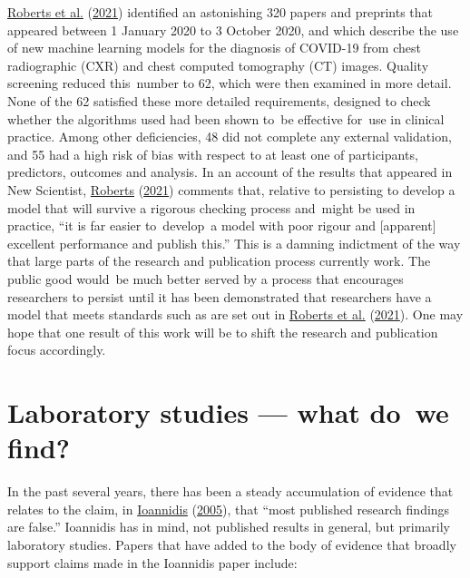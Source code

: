 \documentclass[
  10pt,
  b5paper]{book}
\begin{document}
\protect\hyperlink{ref-roberts2021common}{Roberts et al.} (\protect\hyperlink{ref-roberts2021common}{2021}) identified an astonishing 320 papers and preprints
that appeared between 1 January 2020 to 3 October 2020, and which
describe the use of new machine learning models for the diagnosis of
COVID-19 from chest radiographic (CXR) and chest computed tomography
(CT) images. Quality screening reduced this~number to 62, which were
then examined in more detail. None of the 62 satisfied these more
detailed requirements, designed to check whether the algorithms used
had been shown to~be effective for~use in clinical practice. Among
other deficiencies, 48 did not complete any external validation, and
55 had a high risk of bias with respect to at least one of
participants, predictors, outcomes and analysis. In an account
of the results that appeared in New Scientist, \protect\hyperlink{ref-roberts2021machine}{Roberts} (\protect\hyperlink{ref-roberts2021machine}{2021})
comments that, relative
to persisting to develop a model that will survive a rigorous
checking process and~might be used in practice, ``it is far easier
to~develop~a model with poor rigour and {[}apparent{]} excellent
performance and publish this.'' This is a damning indictment of
the way that large parts of the research and publication process
currently work. The public good would~be much better served
by a process that encourages researchers to persist until it
has been demonstrated that researchers have a model that meets
standards such as are set out in \protect\hyperlink{ref-roberts2021common}{Roberts et al.} (\protect\hyperlink{ref-roberts2021common}{2021}). One may
hope that one result of this work will be to shift the research
and publication focus accordingly.

\hypertarget{laboratory-studies-what-do-we-find}{%
\section{Laboratory studies --- what do~we find?}\label{laboratory-studies-what-do-we-find}}

In the past several years, there has been a steady accumulation
of evidence that relates to the claim, in \protect\hyperlink{ref-r19_ioannidis_2005}{Ioannidis} (\protect\hyperlink{ref-r19_ioannidis_2005}{2005}),
that ``most published research findings are false.'' Ioannidis
has in mind, not published results in general, but primarily
laboratory studies. Papers that have added to the
body of evidence that broadly support claims made in the
Ioannidis paper include:
\end{document}

